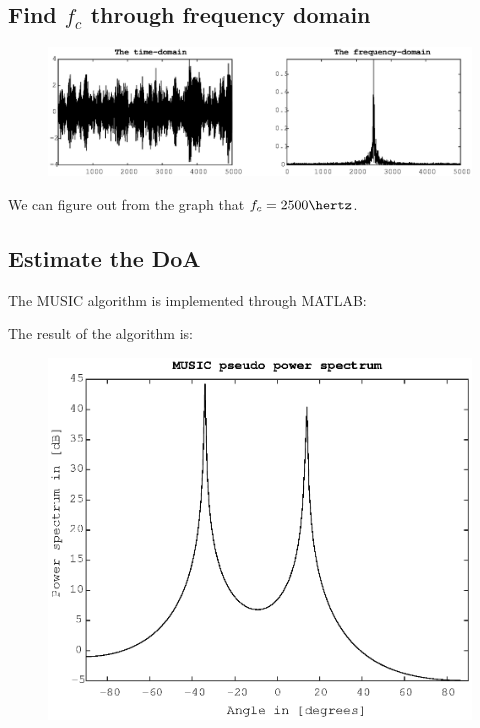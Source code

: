 \documentclass[UTF8]{article}
\begin{document}
\subsection{Find $f_c$ through frequency domain}

\begin{figure}[h]
    \centering
    \includegraphics[scale=0.66]{img/fig02.eps}\\
\end{figure}

We can figure out from the graph that $f_c = 2500\hertz$.

\subsection{Estimate the DoA}
The MUSIC algorithm is implemented through MATLAB:


The result of the algorithm is:

\begin{figure}[H]
    \centering 
    \includegraphics[scale=0.46]{img/fig01.eps}\\
\end{figure}
\end{document}
